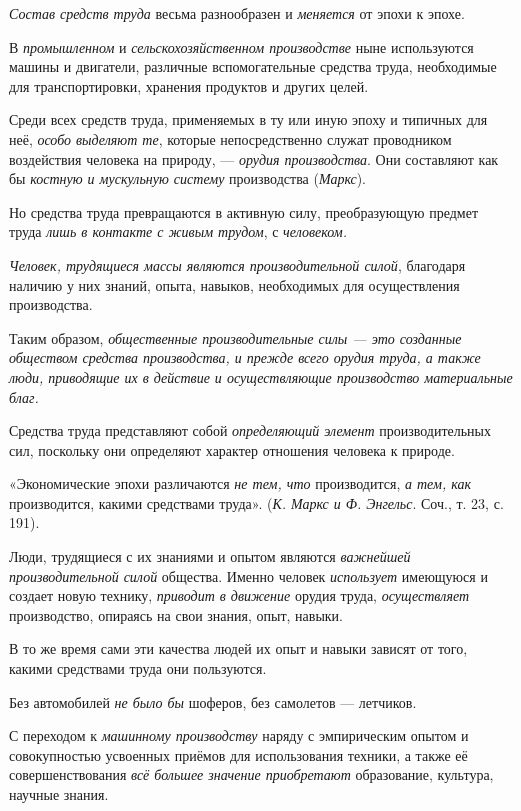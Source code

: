 \documentclass[a4paper,14pt,russian]{extreport}
\begin{document}
\emph{Состав средств труда} весьма разнообразен и \emph{меняется} от эпохи к эпохе.

В \emph{промышленном} и \emph{сельскохозяйственном производстве} ныне используются машины и двигатели, различные вспомогательные средства труда, необходимые для транспортировки, хранения продуктов и других целей.

Среди всех средств труда, применяемых в ту или иную эпоху и типичных для неё, \emph{особо выделяют те}, которые непосредственно служат проводником воздействия человека на природу, --- \emph{орудия производства}. Они составляют как бы \emph{костную и мускульную систему} производства (\emph{Маркс}).

Но средства труда превращаются в активную силу, преобразующую предмет труда \emph{лишь в контакте с живым трудом}, с \emph{человеком.}

\emph{Человек, трудящиеся массы являются производительной силой}, благодаря наличию у них знаний, опыта, навыков, необходимых для осуществления производства.

Таким образом, \emph{общественные производительные силы --- это созданные обществом средства производства, и прежде всего орудия труда, а также люди, приводящие их в действие и осуществляющие производство материальные благ.}

Средства труда представляют собой \emph{определяющий элемент} производительных сил, поскольку они определяют характер отношения человека к природе.

«Экономические эпохи различаются \emph{не тем, что} производится, \emph{а тем, как} производится, какими средствами труда». (\emph{К. Маркс и Ф. Энгельс}. Соч., т. 23, с. 191).

Люди, трудящиеся с их знаниями и опытом являются \emph{важнейшей производительной силой} общества. Именно человек \emph{использует} имеющуюся и создает новую технику, \emph{приводит в движение} орудия труда, \emph{осуществляет} производство, опираясь на свои знания, опыт, навыки.

В то же время сами эти качества людей их опыт и навыки зависят от того, какими средствами труда они пользуются.

Без автомобилей \emph{не было бы} шоферов, без самолетов --- летчиков.

С переходом к \emph{машинному производству} наряду с эмпирическим опытом и совокупностью усвоенных приёмов для использования техники, а также её совершенствования \emph{всё большее значение приобретают} образование, культура, научные знания.
\end{document}
